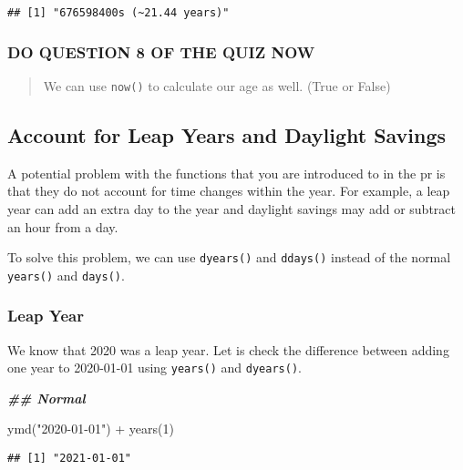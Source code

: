 \documentclass[
]{book}
\newenvironment{Shaded}{\begin{snugshade}}{\end{snugshade}}
\newcommand{\DecValTok}[1]{\textcolor[rgb]{0.00,0.00,0.81}{#1}}
\newcommand{\DocumentationTok}[1]{\textcolor[rgb]{0.56,0.35,0.01}{\textbf{\textit{#1}}}}
\newcommand{\FunctionTok}[1]{\textcolor[rgb]{0.00,0.00,0.00}{#1}}
\newcommand{\NormalTok}[1]{#1}
\newcommand{\SpecialCharTok}[1]{\textcolor[rgb]{0.00,0.00,0.00}{#1}}
\newcommand{\StringTok}[1]{\textcolor[rgb]{0.31,0.60,0.02}{#1}}
\begin{document}
\begin{verbatim}
## [1] "676598400s (~21.44 years)"
\end{verbatim}

\hypertarget{do-question-8-of-the-quiz-now-2}{%
\subsubsection{DO QUESTION 8 OF THE QUIZ NOW}\label{do-question-8-of-the-quiz-now-2}}

\begin{quote}
We can use \texttt{now()} to calculate our age as well. (True or False)
\end{quote}

\hypertarget{account-for-leap-years-and-daylight-savings}{%
\subsection{Account for Leap Years and Daylight Savings}\label{account-for-leap-years-and-daylight-savings}}

A potential problem with the functions that you are introduced to in the pr is that they do not account for time changes within the year. For example, a leap year can add an extra day to the year and daylight savings may add or subtract an hour from a day.

To solve this problem, we can use \texttt{dyears()} and \texttt{ddays()} instead of the normal \texttt{years()} and \texttt{days()}.

\hypertarget{leap-year}{%
\subsubsection{Leap Year}\label{leap-year}}

We know that 2020 was a leap year. Let is check the difference between adding one year to 2020-01-01 using \texttt{years()} and \texttt{dyears()}.

\begin{Shaded}
\begin{Highlighting}[]
\DocumentationTok{\#\# Normal}

\FunctionTok{ymd}\NormalTok{(}\StringTok{"2020{-}01{-}01"}\NormalTok{) }\SpecialCharTok{+} \FunctionTok{years}\NormalTok{(}\DecValTok{1}\NormalTok{)}
\end{Highlighting}
\end{Shaded}

\begin{verbatim}
## [1] "2021-01-01"
\end{verbatim}
\end{document}
